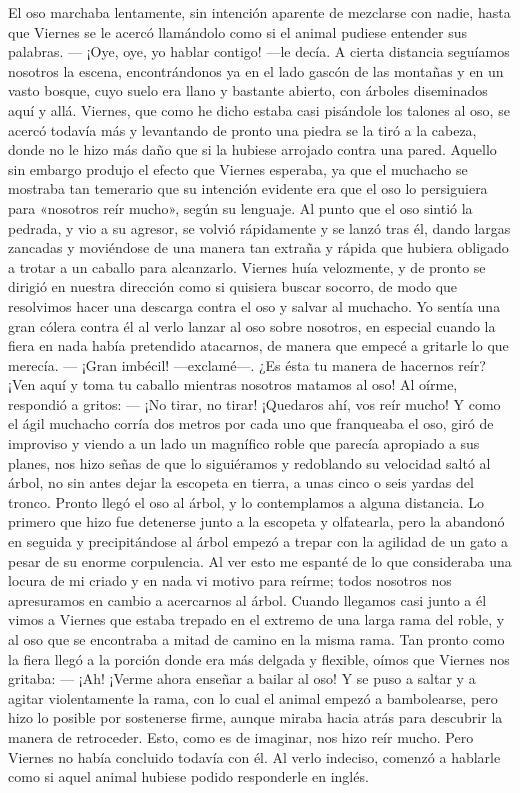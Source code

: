 \documentclass{novela}
\begin{document}
    El oso marchaba lentamente, sin intención aparente de mezclarse con nadie, hasta que Viernes se le acercó llamándolo como si el animal pudiese entender sus palabras. — ¡Oye, oye, yo hablar contigo! —le decía. A cierta distancia seguíamos nosotros la escena, encontrándonos ya en el lado gascón de las montañas y en un vasto bosque, cuyo suelo era llano y bastante abierto, con árboles diseminados aquí y allá.
    Viernes, que como he dicho estaba casi pisándole los talones al oso, se acercó todavía más y levantando de pronto una piedra se la tiró a la cabeza, donde no le hizo más daño que si la hubiese arrojado contra una pared. Aquello sin embargo produjo el efecto que Viernes esperaba, ya que el muchacho se mostraba tan temerario que su intención evidente era que el oso lo persiguiera para «nosotros reír mucho», según su lenguaje.
    Al punto que el oso sintió la pedrada, y vio a su agresor, se volvió rápidamente y se lanzó tras él, dando largas zancadas y moviéndose de una manera tan extraña y rápida que hubiera obligado a trotar a un caballo para alcanzarlo. Viernes huía velozmente, y de pronto se dirigió en nuestra dirección como si quisiera buscar socorro, de modo que resolvimos hacer una descarga contra el oso y salvar al muchacho.
    Yo sentía una gran cólera contra él al verlo lanzar al oso sobre nosotros, en especial cuando la fiera en nada había pretendido atacarnos, de manera que empecé a gritarle lo que merecía.
    — ¡Gran imbécil! —exclamé—. ¿Es ésta tu manera de hacernos reír? ¡Ven aquí y toma tu caballo mientras nosotros matamos al oso!
    Al oírme, respondió a gritos: — ¡No tirar, no tirar! ¡Quedaros ahí, vos reír mucho! Y como el ágil muchacho corría dos metros por cada uno que franqueaba el oso, giró de improviso y viendo a un lado un magnífico roble que parecía apropiado a sus planes, nos hizo señas de que lo siguiéramos y redoblando su velocidad saltó al árbol, no sin antes dejar la escopeta en tierra, a unas cinco o seis yardas del tronco.
    Pronto llegó el oso al árbol, y lo contemplamos a alguna distancia. Lo primero que hizo fue detenerse junto a la escopeta y olfatearla, pero la abandonó en seguida y precipitándose al árbol empezó a trepar con la agilidad de un gato a pesar de su enorme corpulencia.
    Al ver esto me espanté de lo que consideraba una locura de mi criado y en nada vi motivo para reírme; todos nosotros nos apresuramos en cambio a acercarnos al árbol. Cuando llegamos casi junto a él vimos a Viernes que estaba trepado en el extremo de una larga rama del roble, y al oso que se encontraba a mitad de camino en la misma rama. Tan pronto como la fiera llegó a la porción donde era más delgada y flexible, oímos que Viernes nos gritaba: — ¡Ah! ¡Verme ahora enseñar a bailar al oso! Y se puso a saltar y a agitar violentamente la rama, con lo cual el animal empezó a bambolearse, pero hizo lo posible por sostenerse firme, aunque miraba hacia atrás para descubrir la manera de retroceder. Esto, como es de imaginar, nos hizo reír mucho. Pero Viernes no había concluido todavía con él. Al verlo indeciso, comenzó a hablarle como si aquel animal hubiese podido responderle en inglés.
\end{document}
